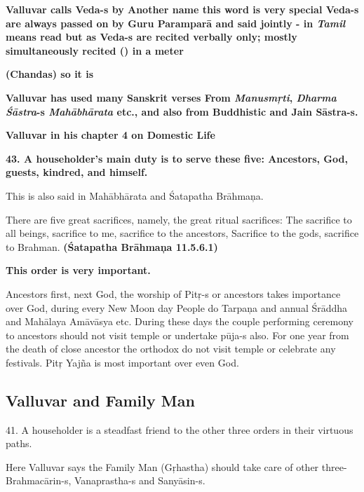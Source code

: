 \textbf{Valluvar calls Veda-s by Another name  this word is very special Veda-s are always passed on by Guru Paramparā and said jointly - in \textit{Tamil}  means read but as Veda-s are recited verbally only; mostly simultaneously recited () in a meter}

\textbf{(Chandas) so it is }

\textbf{Valluvar has used many Sanskrit verses From \textit{Manusmŗti}, \textit{Dharma Śāstra}-s \textit{Mahābhārata} etc., and also from Buddhistic and Jain Sāstra-s.}

\textbf{Valluvar in his chapter 4 on Domestic Life}

\textbf{43. A householder's main duty is to serve these five: Ancestors, God, guests, kindred, and himself.}

This is also said in Mahābhārata and Śatapatha Brāhmaņa.

There are five great sacrifices, namely, the great ritual sacrifices: The sacrifice to all beings, sacrifice to me, sacrifice to the ancestors, Sacrifice to the gods, sacrifice to Brahman. \textbf{(Śatapatha Brāhmaņa 11.5.6.1)}

\textbf{This order is very important.}

Ancestors first, next God, the worship of Pitŗ-s or ancestors takes importance over God, during every New Moon day People do Tarpaņa and annual Śrāddha and Mahālaya Amāvāsya etc. During these days the couple performing ceremony to ancestors should not visit temple or undertake pūja-s also. For one year from the death of close ancestor the orthodox do not visit temple or celebrate any festivals. Pitŗ Yajña is most important over even God.


\subsection*{Valluvar and Family Man}

41. A householder is a steadfast friend to the other three orders in their virtuous paths.

Here Valluvar says the Family Man (Gŗhastha) should take care of other three- Brahmacārin-s, Vanaprastha-s and Sanyāsin-s.

